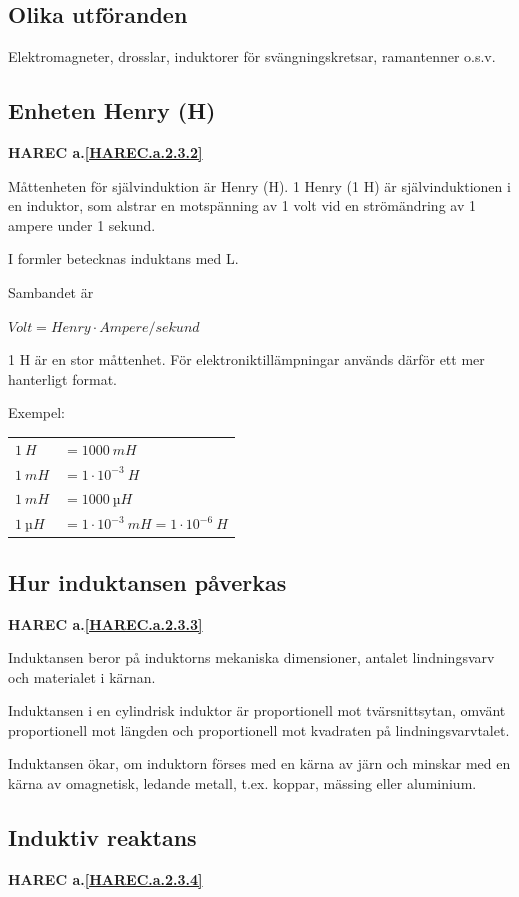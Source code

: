 \subsection{Olika utföranden}

Elektromagneter, drosslar, induktorer för svängningskretsar, ramantenner o.s.v.

\subsection{Enheten Henry (H)}
\textbf{HAREC a.\ref{HAREC.a.2.3.2}\label{myHAREC.a.2.3.2}}

Måttenheten för självinduktion är Henry (H). 1 Henry (1 H) är självinduktionen i
en induktor, som alstrar en motspänning av 1 volt vid en strömändring av 1
ampere under 1 sekund.

I formler betecknas induktans med L.

Sambandet är

\(Volt = Henry \cdot Ampere/sekund\)

1 H är en stor måttenhet. För elektroniktillämpningar används därför ett mer
hanterligt format.

Exempel:

\begin{tabular}{ll}
\(1\ H \) & \(= 1000\ mH\) \\
\(1\ mH\) & \(= 1 \cdot 10^{-3}\ H\) \\
\(1\ mH\) & \(= 1000\ µH\) \\
\(1\ µH\) & \(= 1 \cdot 10^{-3}\ mH = 1 \cdot 10^{-6}\ H \)
\end{tabular}

\subsection{Hur induktansen påverkas}
\textbf{HAREC a.\ref{HAREC.a.2.3.3}\label{myHAREC.a.2.3.3}}

Induktansen beror på induktorns mekaniska dimensioner, antalet lindningsvarv och
materialet i kärnan.

Induktansen i en cylindrisk induktor är proportionell mot tvärsnittsytan, omvänt
proportionell mot längden och proportionell mot kvadraten på lindningsvarvtalet.

Induktansen ökar, om induktorn förses med en kärna av järn och minskar med en
kärna av omagnetisk, ledande metall, t.ex. koppar, mässing eller aluminium.

\subsection{Induktiv reaktans}
\textbf{HAREC a.\ref{HAREC.a.2.3.4}\label{myHAREC.a.2.3.4}}

